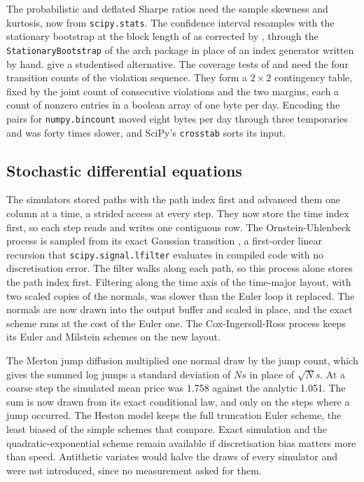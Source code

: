 The probabilistic and deflated Sharpe ratios
\citep{lo_statistics_2002,bailey_sharpe_2012,bailey_deflated_2014} need the
sample skewness and kurtosis, now from \texttt{scipy.stats}. The confidence
interval resamples with the stationary bootstrap
\citep{politis_stationary_1994,efron_introduction_1993} at the block length of
\citet{politis_automatic_2004} as corrected by \citet{patton_correction_2009},
through the \texttt{StationaryBootstrap} of the arch package
\citep{sheppard_arch_2024} in place of an index generator written by hand.
\citet{ledoit_robust_2008} give a studentised alternative. The coverage tests
of \citet{kupiec_techniques_1995} and \citet{christoffersen_evaluating_1998}
need the four transition counts of the violation sequence. They form a
$2 \times 2$ contingency table, fixed by the joint count of consecutive
violations and the two margins, each a count of nonzero entries in a boolean
array of one byte per day. Encoding the pairs for \texttt{numpy.bincount}
moved eight bytes per day through three temporaries and was forty times
slower, and SciPy's \texttt{crosstab} sorts its input.

\subsection{Stochastic differential equations}

The simulators \citep{kloeden_numerical_1992,glasserman_monte_2003} stored
paths with the path index first and advanced them one column at a time, a
strided access at every step. They now store the time index first, so each
step reads and writes one contiguous row. The Ornstein-Uhlenbeck process
\citep{uhlenbeck_theory_1930,vasicek_equilibrium_1977} is sampled from its
exact Gaussian transition \citep{gillespie_exact_1996}, a first-order linear
recursion that \texttt{scipy.signal.lfilter} evaluates in compiled code with
no discretisation error. The filter walks along each path, so this process
alone stores the path index first. Filtering along the time axis of the
time-major layout, with two scaled copies of the normals, was slower than the
Euler loop it replaced. The normals are now drawn into the output buffer and
scaled in place, and the exact scheme runs at the cost of the Euler one. The
Cox-Ingersoll-Ross process
\citep{cox_theory_1985} keeps its Euler and Milstein
\citep{milstein_approximate_1975} schemes on the new layout.

The Merton jump diffusion \citep{merton_option_1976} multiplied one normal
draw by the jump count, which gives the summed log jumps a standard deviation
of $N s$ in place of $\sqrt{N} s$. At a coarse step the simulated mean price
was 1.758 against the analytic 1.051. The sum is now drawn from its exact
conditional law, and only on the steps where a jump occurred. The Heston
model \citep{heston_closedform_1993} keeps the full truncation Euler scheme,
the least biased of the simple schemes that \citet{lord_comparison_2010}
compare. Exact simulation \citep{broadie_exact_2006} and the
quadratic-exponential scheme \citep{andersen_simple_2008} remain available
if discretisation bias matters more than speed. Antithetic variates
\citep{hammersley_new_1956} would halve the draws of every simulator and were
not introduced, since no measurement asked for them.

